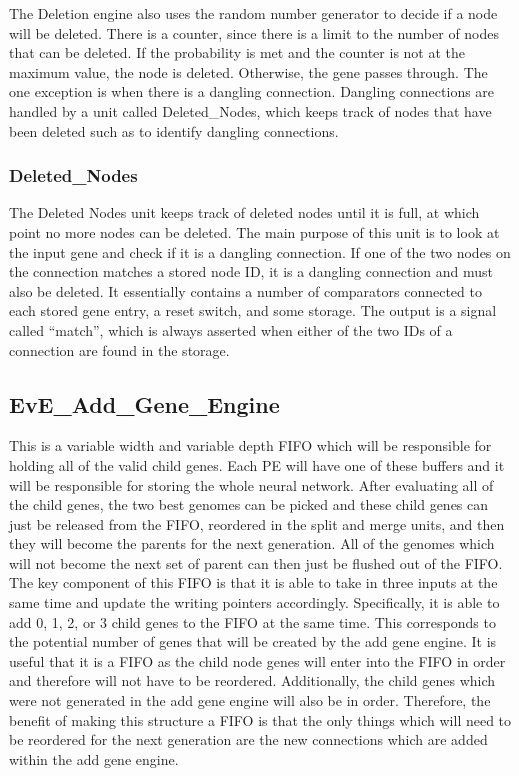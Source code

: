 \documentclass[preprint,pre,floats,aps,amsmath,amssymb]{revtex4}
\begin{document}
The Deletion engine also uses the random number generator to decide if a node will be deleted. There is a counter, since there is a limit to the number of nodes that can be deleted. If the probability is met and the counter is not at the maximum value, the node is deleted. Otherwise, the gene passes through. The one exception is when there is a dangling connection. Dangling connections are handled by a unit called Deleted\_Nodes, which keeps track of nodes that have been deleted such as to identify dangling connections.

\subsubsection{Deleted\_Nodes}

The Deleted Nodes unit keeps track of deleted nodes until it is full, at which point no more nodes can be deleted. The main purpose of this unit is to look at the input gene and check if it is a dangling connection. If one of the two nodes on the connection matches a stored node ID, it is a dangling connection and must also be deleted. It essentially contains a number of comparators connected to each stored gene entry, a reset switch, and some storage. The output is a signal called “match”, which is always asserted when either of the two IDs of a connection are found in the storage.

\subsection{EvE\_Add\_Gene\_Engine}

This is a variable width and variable depth FIFO which will be responsible for holding all of the valid child genes. Each PE will have one of these buffers and it will be responsible for storing the whole neural network. After evaluating all of the child genes, the two best genomes can be picked and these child genes can just be released from the FIFO, reordered in the split and merge units, and then they will become the parents for the next generation. All of the genomes which will not become the next set of parent can then just be flushed out of the FIFO.
\newline \indent
The key component of this FIFO is that it is able to take in three inputs at the same time and update the writing pointers accordingly. Specifically, it is able to add 0, 1, 2, or 3 child genes to the FIFO at the same time. This corresponds to the potential number of genes that will be created by the add gene engine. It is useful that it is a FIFO as the child node genes will enter into the FIFO in order and therefore will not have to be reordered. Additionally, the child genes which were not generated in the add gene engine will also be in order. Therefore, the benefit of making this structure a FIFO is that the only things which will need to be reordered for the next generation are the new connections which are added within the add gene engine.
\end{document}
